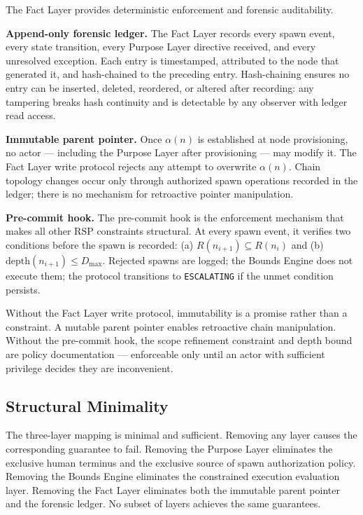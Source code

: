 The Fact Layer provides deterministic enforcement and forensic auditability.

\medskip
\noindent\textbf{Append-only forensic ledger.} The Fact Layer records every spawn event, every state transition, every Purpose Layer directive received, and every unresolved exception. Each entry is timestamped, attributed to the node that generated it, and hash-chained to the preceding entry. Hash-chaining ensures no entry can be inserted, deleted, reordered, or altered after recording: any tampering breaks hash continuity and is detectable by any observer with ledger read access.

\medskip
\noindent\textbf{Immutable parent pointer.} Once $\alpha(n)$ is established at node provisioning, no actor — including the Purpose Layer after provisioning — may modify it. The Fact Layer write protocol rejects any attempt to overwrite $\alpha(n)$. Chain topology changes occur only through authorized spawn operations recorded in the ledger; there is no mechanism for retroactive pointer manipulation.

\medskip
\noindent\textbf{Pre-commit hook.} The pre-commit hook is the enforcement mechanism that makes all other RSP constraints structural. At every spawn event, it verifies two conditions before the spawn is recorded: (a) $R(n_{i+1}) \subseteq R(n_i)$ and (b) $\mathrm{depth}(n_{i+1}) \leq D_{\mathrm{max}}$. Rejected spawns are logged; the Bounds Engine does not execute them; the protocol transitions to \texttt{ESCALATING} if the unmet condition persists.

Without the Fact Layer write protocol, immutability is a promise rather than a constraint. A mutable parent pointer enables retroactive chain manipulation. Without the pre-commit hook, the scope refinement constraint and depth bound are policy documentation — enforceable only until an actor with sufficient privilege decides they are inconvenient.

\subsection{Structural Minimality}
\label{sec:rs-minimality}

The three-layer mapping is minimal and sufficient. Removing any layer causes the corresponding guarantee to fail. Removing the Purpose Layer eliminates the exclusive human terminus and the exclusive source of spawn authorization policy. Removing the Bounds Engine eliminates the constrained execution evaluation layer. Removing the Fact Layer eliminates both the immutable parent pointer and the forensic ledger. No subset of layers achieves the same guarantees.

